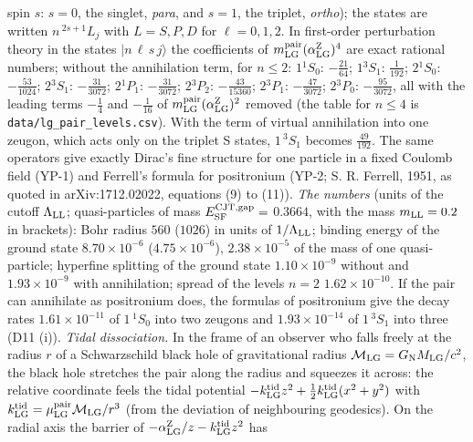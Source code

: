 \documentclass[
  10pt,
]{article}
\begin{document}
\begin{longtable}[]
spin \(s\): \(s=0\), the singlet, \emph{para}, and \(s=1\), the triplet,
\emph{ortho}); the states are written \(n\,{}^{2s+1}L_j\) with
\(L=S,P,D\) for \(\ell=0,1,2\). In first-order perturbation theory in
the states \(|n\,\ell\,s\,j\rangle\) the coefficients of
\(m^{\rm pair}_{\rm LG}(\alpha^{\rm Z}_{\rm LG})^4\) are exact rational
numbers; without the annihilation term, for \(n\le2\): \(1{}^{1}S_{0}\):
\(-\tfrac{21}{64}\); \(1{}^{3}S_{1}\): \(\tfrac{1}{192}\);
\(2{}^{1}S_{0}\): \(-\tfrac{53}{1024}\); \(2{}^{3}S_{1}\):
\(-\tfrac{31}{3072}\); \(2{}^{1}P_{1}\): \(-\tfrac{31}{3072}\);
\(2{}^{3}P_{2}\): \(-\tfrac{43}{15360}\); \(2{}^{3}P_{1}\):
\(-\tfrac{47}{3072}\); \(2{}^{3}P_{0}\): \(-\tfrac{95}{3072}\), all with
the leading terms \(-\tfrac14\) and \(-\tfrac1{16}\) of
\(m^{\rm pair}_{\rm LG}(\alpha^{\rm Z}_{\rm LG})^2\) removed (the table
for \(n\le4\) is \texttt{data/lg\_pair\_levels.csv}). With the term of
virtual annihilation into one zeugon, which acts only on the triplet S
states, \(1\,{}^3S_1\) becomes \(\tfrac{49}{192}\). The same operators
give exactly Dirac's fine structure for one particle in a fixed Coulomb
field (YP-1) and Ferrell's formula for positronium (YP-2; S. R. Ferrell,
1951, as quoted in arXiv:1712.02022, equations (9) to (11)). \emph{The
numbers} (units of the cutoff \(\Lambda_{\rm LL}\); quasi-particles of
mass \(E^{\rm CJT,gap}_{\rm SF}=\) \(0.3664\), with the mass
\(m_{\rm LL}=0.2\) in brackets): Bohr radius \(560\) (\(1026\)) in units
of \(1/\Lambda_{\rm LL}\); binding energy of the ground state
\(8.70\times10^{-6}\) (\(4.75\times10^{-6}\)), \(2.38\times10^{-5}\) of
the mass of one quasi-particle; hyperfine splitting of the ground state
\(1.10\times10^{-9}\) without and \(1.93\times10^{-9}\) with
annihilation; spread of the levels \(n=2\) \(1.62\times10^{-10}\). If
the pair can annihilate as positronium does, the formulas of positronium
give the decay rates \(1.61\times10^{-11}\) of \(1\,{}^1S_0\) into two
zeugons and \(1.93\times10^{-14}\) of \(1\,{}^3S_1\) into three (D11
(i)). \emph{Tidal dissociation.} In the frame of an observer who falls
freely at the radius \(r\) of a Schwarzschild black hole of
gravitational radius \(\mathcal M_{\rm LG}=G_{\rm N}M_{\rm LG}/c^2\),
the black hole stretches the pair along the radius and squeezes it
across: the relative coordinate feels the tidal potential
\(-k^{\rm tid}_{\rm LG}z^2+\tfrac12k^{\rm tid}_{\rm LG}(x^2+y^2)\) with
\(k^{\rm tid}_{\rm LG}=\mu^{\rm pair}_{\rm LG}\mathcal M_{\rm LG}/r^3\)
(from the deviation of neighbouring geodesics). On the radial axis the
barrier of \(-\alpha^{\rm Z}_{\rm LG}/z-k^{\rm tid}_{\rm LG}z^2\) has

\end{longtable}
\end{document}
